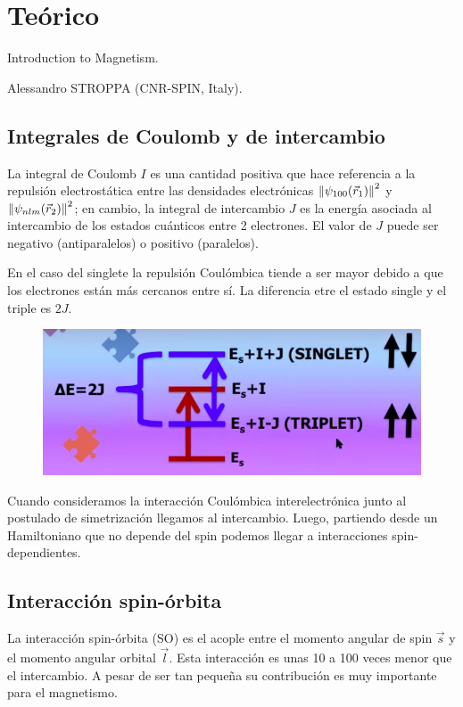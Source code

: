 \section{Teórico}

   Introduction to Magnetism.

  	Alessandro STROPPA (CNR-SPIN, Italy).

\subsection{Integrales de Coulomb y de intercambio}

  La integral de Coulomb $I$ es una cantidad positiva que hace referencia a la repulsión electrostática entre las densidades electrónicas $\norm{\psi_{100} (\vec{r}_1)}^2$ y $\norm{\psi_{nlm} (\vec{r}_2)}^2$; en cambio, la integral de intercambio $J$ es la energía asociada al intercambio de los estados cuánticos entre 2 electrones. El valor de $J$ puede ser negativo (antiparalelos) o positivo (paralelos).

  En el caso del singlete la repulsión Coulómbica tiende a ser mayor debido a que los electrones están más cercanos entre sí. La diferencia etre el estado single y el triple es $2J$.
    \begin{figure}[H]
        \centering
        \includegraphics[scale = 0.6]{figs/D7/IJ.png}
    \end{figure}

  Cuando consideramos la interacción Coulómbica interelectrónica junto al postulado de simetrización llegamos al intercambio. Luego, partiendo desde un Hamiltoniano que no depende del spin podemos llegar a interacciones spin-dependientes.

\subsection{Interacción spin-órbita}

  La interacción spin-órbita (SO) es el acople entre el momento angular de spin $\vec{s}$ y el momento angular orbital $\vec{l}$. Esta interacción es unas 10 a 100 veces menor que el intercambio. A pesar de ser tan pequeña su  contribución es muy importante para el magnetismo.

